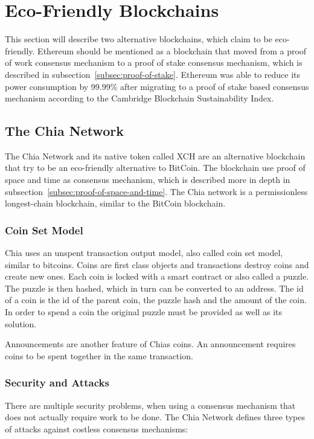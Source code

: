 
\section{Eco-Friendly Blockchains}\label{sec:alternative-blockchains}
This section will describe two alternative blockchains, which claim to be eco-friendly.
Ethereum should be mentioned as a blockchain that moved from a proof of work consensus mechanism to a proof of stake consensus mechanism, which is described in subsection\ \ref{subsec:proof-of-stake}.
Ethereum was able to reduce its power consumption by 99.99\% after migrating to a proof of stake based consensus mechanism according to the Cambridge Blockchain Sustainability Index.\cite{CBECI}

\subsection{The Chia Network}\label{subsec:chia}
The Chia Network and its native token called XCH are an alternative blockchain that try to be an eco-friendly alternative to BitCoin.
The blockchain use proof of space and time as consensus mechanism, which is described more in depth in subsection\ \ref{subsec:proof-of-space-and-time}.
The Chia network is a permissionless longest-chain blockchain, similar to the BitCoin blockchain.\cite{chia-whitepaper,chia-greenpaper}

\subsubsection{Coin Set Model}
Chia uses an unspent transaction output model, also called coin set model, similar to bitcoins.
Coins are first class objects and transactions destroy coins and create new ones.
Each coin is locked with a smart contract or also called a puzzle.
The puzzle is then hashed, which in turn can be converted to an address.
The id of a coin is the id of the parent coin, the puzzle hash and the amount of the coin.
In order to spend a coin the original puzzle must be provided as well as its solution.

Announcements are another feature of Chias coins.
An announcement requires coins to be spent together in the same transaction.

\subsubsection{Security and Attacks}
There are multiple security problems, when using a consensus mechanism that does not actually require work to be done.
The Chia Network defines three types of attacks against costless consensus mechanisms:

